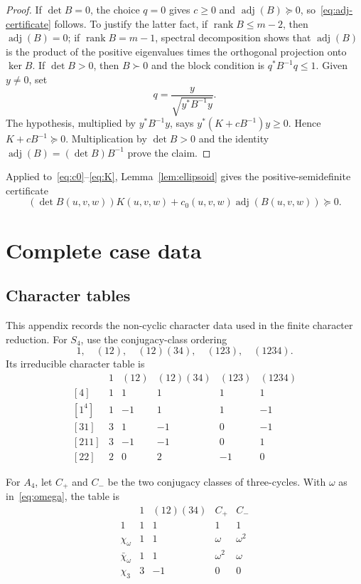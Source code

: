 \documentclass[10pt,twoside]{siamart1116}
\newcommand{\adj}{\operatorname{adj}}
\newcommand{\psd}{\succeq 0}
\newcommand{\pd}{\succ 0}
\begin{document}
\begin{proof}
If $\det B=0$, the choice $q=0$ gives $c\geq0$ and
$\adj(B)\psd$, so~\eqref{eq:adj-certificate} follows.  To justify the latter
fact, if $\operatorname{rank}B\leq m-2$, then $\adj(B)=0$; if
$\operatorname{rank}B=m-1$, spectral decomposition shows that $\adj(B)$ is
the product of the positive eigenvalues times the orthogonal projection onto
$\ker B$.  If $\det B>0$, then $B\pd$ and the block condition is
$q^*B^{-1}q\leq1$.  Given $y\neq0$, set
\[
 q=\frac{y}{\sqrt{y^*B^{-1}y}}.
\]
The hypothesis, multiplied by $y^*B^{-1}y$, says
$y^*(K+cB^{-1})y\geq0$.  Hence $K+cB^{-1}\psd$.  Multiplication by
$\det B>0$ and the identity $\adj(B)=(\det B)B^{-1}$ prove the claim.
\end{proof}

Applied to~\eqref{eq:c0}--\eqref{eq:K}, Lemma~\ref{lem:ellipsoid} gives the
positive-semidefinite certificate
\begin{equation}\label{eq:a4-certificate}
 (\det B(u,v,w))K(u,v,w)+c_0(u,v,w)\adj(B(u,v,w))\psd.
\end{equation}

\appendix

\section{Complete case data}\label{app:character-data}

\subsection{Character tables}

This appendix records the non-cyclic character data used in the finite
character reduction.  For $S_4$, use the conjugacy-class ordering
\[
 1,\quad(12),\quad(12)(34),\quad(123),\quad(1234).
\]
Its irreducible character table is
\begin{equation}\label{eq:s4-table}
\begin{array}{c|rrrrr}
 &1&(12)&(12)(34)&(123)&(1234)\\\hline
{[4]}    &1& 1& 1& 1& 1\\
{[1^4]}  &1&-1& 1& 1&-1\\
{[31]}   &3& 1&-1& 0&-1\\
{[211]}  &3&-1&-1& 0& 1\\
{[22]}   &2& 0& 2&-1& 0
\end{array}
\end{equation}

For $A_4$, let $C_+$ and $C_-$ be the two conjugacy classes of
three-cycles.  With $\omega$ as in~\eqref{eq:omega}, the table is
\begingroup
\renewcommand{\arraystretch}{1.15}
\begin{equation}\label{eq:a4-table}
\begin{array}{c|rrrr}
 &1&(12)(34)&C_+&C_-\\\hline
1&1&1&1&1\\
\chi_\omega&1&1&\omega&\omega^2\\
\bar\chi_\omega&1&1&\omega^2&\omega\\
\chi_3&3&-1&0&0
\end{array}
\end{equation}
\endgroup
\end{document}
